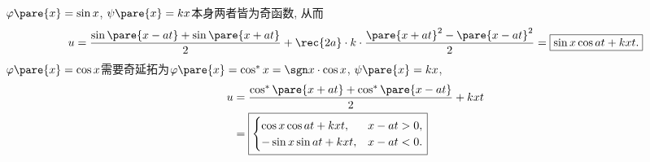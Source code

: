 \documentclass[hidelinks]{ctexart}
\begin{document}
%
$\varphi\pare{x} = \sin x$, $\psi\pare{x} = kx$本身两者皆为奇函数, 从而
\[ u = \frac{\sin\pare{x-at} + \sin\pare{x+at}}{2} + \rec{2a}\cdot k \cdot \frac{\pare{x+at}^2 - \pare{x-at}^2}{2} = \boxed{\sin x\cos at + kxt.} \]
%
$\varphi\pare{x} = \cos x$需要奇延拓为$\varphi\pare{x} = \cos^* x = \sgn x \cdot \cos x$, $\psi\pare{x} = kx$,
\begin{align*}
    u &= \frac{\cos^*\pare{x+at} + \cos^*\pare{x-at}}{2} + kxt \\
      &= \boxed{\begin{cases}
          \cos x \cos at + kxt, & x-at > 0, \\
          -\sin x \sin at + kxt, & x-at < 0.
      \end{cases}}
\end{align*}
\end{document}
